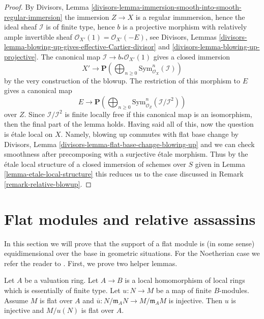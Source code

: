 \begin{proof}
By Divisors, Lemma
\ref{divisors-lemma-immersion-smooth-into-smooth-regular-immersion}
the immersion $Z \to X$ is a regular immmersion, hence
the ideal sheaf $\mathcal{I}$ is of finite type, hence $b$ is a projective
morphism with relatively ample invertible sheaf
$\mathcal{O}_{X'}(1) = \mathcal{O}_{X'}(-E)$, see
Divisors, Lemmas
\ref{divisors-lemma-blowing-up-gives-effective-Cartier-divisor} and
\ref{divisors-lemma-blowing-up-projective}.
The canonical map $\mathcal{I} \to b_*\mathcal{O}_{X'}(1)$
gives a closed immersion
$$
X' \longrightarrow
\mathbf{P}\left(\bigoplus\nolimits_{n \geq 0}
\text{Sym}^n_{\mathcal{O}_X}(\mathcal{I})\right)
$$
by the very construction of the blowup. The restriction of this morphism
to $E$ gives a canonical map
$$
E \longrightarrow
\mathbf{P}\left(\bigoplus\nolimits_{n \geq 0}
\text{Sym}^n_{\mathcal{O}_Z}(\mathcal{I}/\mathcal{I}^2)\right)
$$
over $Z$. Since $\mathcal{I}/\mathcal{I}^2$ is finite locally free
if this canonical map is an isomorphism, then the final part of the
lemma holds. Having said all of this, now the question is \'etale
local on $X$. Namely, blowing up commutes with flat base change by
Divisors, Lemma \ref{divisors-lemma-flat-base-change-blowing-up}
and we can check smoothness after precomposing with a surjective
\'etale morphism. Thus by the \'etale local structure of a
closed immersion of schemes over $S$ given in Lemma
\ref{lemma-etale-local-structure} this reduces us to the
case discussed in Remark \ref{remark-relative-blowup}.
\end{proof}








\section{Flat modules and relative assassins}
\label{section-flat-relative-assassin}

\noindent
In this section we will prove that the support of a flat module is
(in some sense) equidimensional over the base in geometric situations.
For the Noetherian case we refer the reader to
\cite[IV Proposition 12.1.1.5]{EGA}.
First, we prove two helper lemmas.

\begin{lemma}
\label{lemma-mod-injective-valuation-ring}
Let $A$ be a valuation ring. Let $A \to B$ is a local homomorphism of
local rings which is essentially of finite type.
Let $u : N \to M$ be a map of finite $B$-modules.
Assume $M$ is flat over $A$ and
$\overline{u} : N/\mathfrak m_A N \to M/\mathfrak m_A M$ is injective.
Then $u$ is injective and $M/u(N)$ is flat over $A$.
\end{lemma}

